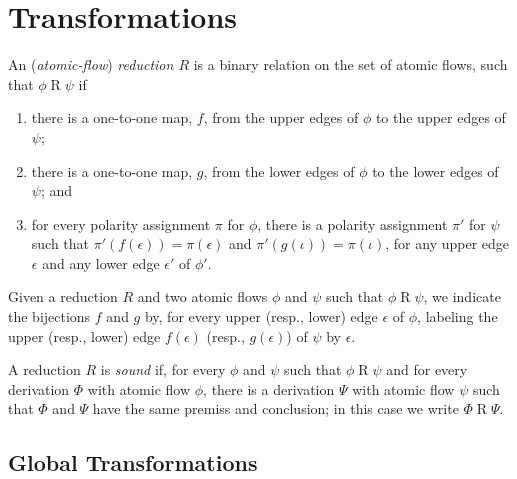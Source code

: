 \chapter{Transformations}


\begin{definition}\label{definition:FlowReduction}
An (\emph{atomic-flow}) \emph{reduction $R$} is a binary relation on the set of atomic flows, such that $\phi\mathrel{R}\psi$ if
\begin{enumerate}
\item
there is a one-to-one map, $f$, from the upper edges of $\phi$ to the upper edges of $\psi$;
\item
there is a one-to-one map, $g$, from the lower edges of $\phi$ to the lower edges of $\psi$; and
\item\label{definition:FlowReduction:item:Polarity}
for every polarity assignment $\pi$ for $\phi$, there is a polarity assignment $\pi'$ for $\psi$ such that $\pi'(f(\epsilon))=\pi(\epsilon)$ and $\pi'(g(\iota))=\pi(\iota)$, for any upper edge $\epsilon$ and any lower edge $\epsilon'$ of $\phi'$.
\end{enumerate}
\end{definition}

\begin{remark}\label{remark:LabelBijectionEdges}
Given a reduction $R$ and two atomic flows $\phi$ and $\psi$ such that $\phi\mathrel{R}\psi$, we indicate the bijections $f$ and $g$ by, for every upper (resp., lower) edge $\epsilon$ of $\phi$, labeling the upper (resp., lower) edge $f(\epsilon)$ (resp., $g(\epsilon)$) of $\psi$ by $\epsilon$.
\end{remark}

\begin{definition}\label{definition:SoundRedcution}
A reduction $R$ is \emph{sound} if, for every $\phi$ and $\psi$ such that $\phi\mathrel{R}\psi$ and for every derivation $\Phi$ with atomic flow $\phi$, there is a derivation $\Psi$ with atomic flow $\psi$ such that $\Phi$ and $\Psi$ have the same premiss and conclusion; in this case we write $\Phi\mathrel{R}\Psi$.
\end{definition}


\section{Global Transformations}\label{section:GlobalTransformations}

